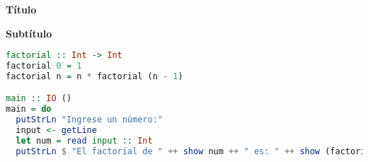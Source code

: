 
{\bfseries\Large\color{Variante3} Título}

{\bfseries\large\color{Variante7} Subtítulo}

\lipsum[1-2]

\vfill

\begin{lstlisting}[style=mystyle, language=Haskell]
factorial :: Int -> Int
factorial 0 = 1
factorial n = n * factorial (n - 1)

main :: IO ()
main = do
  putStrLn "Ingrese un número:"
  input <- getLine
  let num = read input :: Int
  putStrLn $ "El factorial de " ++ show num ++ " es: " ++ show (factorial num)
\end{lstlisting}

\newpage

